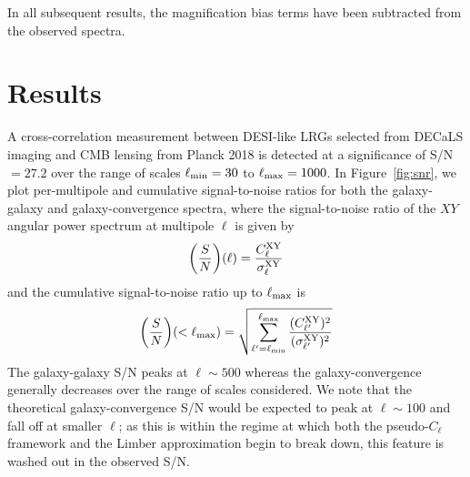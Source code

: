 \documentclass[a4paper,usenatbib]{mnras}
\begin{document}
In all subsequent results, the magnification bias terms have been subtracted from the observed spectra.

\section{Results}\label{sec:results}
%

A cross-correlation measurement between DESI-like LRGs selected from DECaLS imaging and CMB lensing from Planck 2018 is detected at a significance of S/N $= 27.2$ over the range of scales $\ell_{\rm min}=30$ to $\ell_{\rm max}=1000$. In Figure~\ref{fig:snr}, we plot per-multipole and cumulative signal-to-noise ratios for both the galaxy-galaxy and galaxy-convergence spectra, where the signal-to-noise ratio of the $XY$ angular power spectrum at multipole $\ell$ is given by
\begin{equation}
    {\bigg (} \frac{S}{N}{\bigg )}(\ell) = \frac{C_{\ell}^{\rm XY}}{\sigma_{\ell}^{\rm XY}}
\end{equation}
and the cumulative signal-to-noise ratio up to $\ell_{\rm max}$ is
\begin{equation}
    {\bigg (} \frac{S}{N}{\bigg )}(< \ell_{\rm max}) = \sqrt{\sum_{\ell^{\prime}=\ell_{\rm min}}^{\ell_{\rm max}}\frac{(C_{\ell^{\prime}}^{\rm XY})^2}{(\sigma_{\ell^{\prime}}^{\rm XY})^2}}
\end{equation}
The galaxy-galaxy S/N peaks at $\ell \sim 500$ whereas the galaxy-convergence generally decreases over the range of scales considered. We note that the theoretical galaxy-convergence S/N would be expected to peak at $\ell \sim 100$ and fall off at smaller $\ell$; as this is within the regime at which both the pseudo-$C_{\ell}$ framework and the Limber approximation begin to break down, this feature is washed out in the observed S/N.
\end{document}
